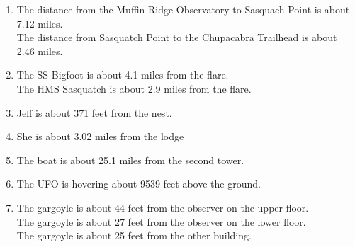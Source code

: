\begin{enumerate}
\item The distance from the Muffin Ridge Observatory to Sasquach Point is about 7.12 miles.\\
The distance from Sasquatch Point to the Chupacabra Trailhead is about 2.46 miles.

\item  The SS Bigfoot is about 4.1 miles from the flare. \\
The HMS Sasquatch is about 2.9 miles from the flare.

\item  Jeff is about 371 feet from the nest.

\item  She is about 3.02 miles from the lodge

\item  The boat is about 25.1 miles from the second tower.

\item  The UFO is hovering about 9539 feet above the ground.

\item The gargoyle is about 44 feet from the observer on the upper floor. \\
The gargoyle is about 27 feet from the observer on the lower floor. \\
The gargoyle is about 25 feet from the other building.

\end{enumerate}

\closegraphsfile